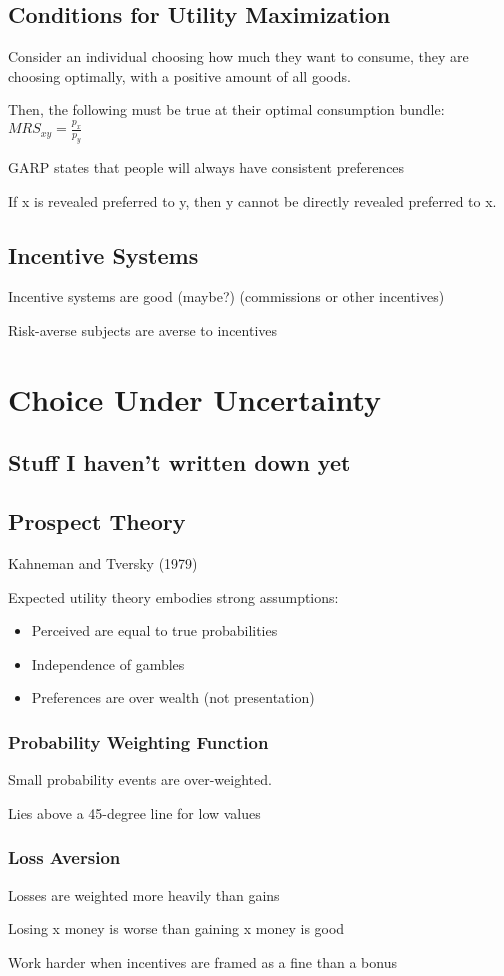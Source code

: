 \documentclass[12pt]{article}
\begin{document}
\subsection{Conditions for Utility Maximization}

Consider an individual choosing how much they want to consume, they are choosing optimally, with a positive amount of all goods.

Then, the following must be true at their optimal consumption bundle: $MRS_{xy} = \frac{p_{x}}{p_{y}}$

GARP states that people will always have consistent preferences

If x is revealed preferred to y, then y cannot be directly revealed preferred to x.

\subsection{Incentive Systems}

Incentive systems are good (maybe?) (commissions or other incentives)

Risk-averse subjects are averse to incentives

\section{Choice Under Uncertainty}

\subsection{Stuff I haven't written down yet}

\subsection{Prospect Theory}

Kahneman and Tversky (1979)

Expected utility theory embodies strong assumptions:
\begin{itemize}
    \item Perceived are equal to true probabilities
    \item Independence of gambles
    \item Preferences are over wealth (not presentation)
\end{itemize}

\subsubsection{Probability Weighting Function}

Small probability events are over-weighted.

Lies above a 45-degree line for low values

\subsubsection{Loss Aversion}

Losses are weighted more heavily than gains

Losing x money is worse than gaining x money is good

Work harder when incentives are framed as a fine than a bonus
\end{document}
